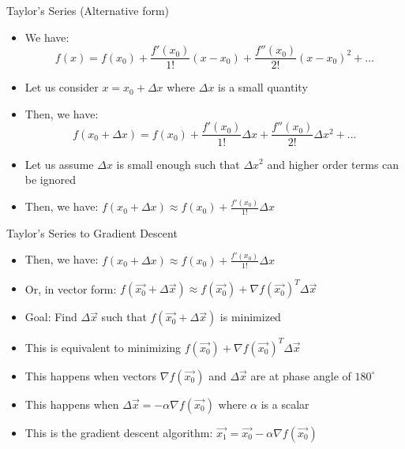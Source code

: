 \documentclass[usenames,dvipsnames]{beamer}
\begin{document}
  \begin{frame}{Taylor's Series (Alternative form)}
    \begin{itemize}[<+->]
    \item We have:
        \begin{equation}
            f(x) = f(x_0) + \frac{f'(x_0)}{1!}(x-x_0) + \frac{f''(x_0)}{2!}(x-x_0)^2 + \ldots
        \end{equation}
    \item Let us consider $x = x_0 + \Delta x$ where $\Delta x$ is a small quantity
    \item Then, we have:
    \begin{equation}
        f(x_0 + \Delta x) = f(x_0) + \frac{f'(x_0)}{1!}\Delta x + \frac{f''(x_0)}{2!}\Delta x^2 + \ldots
    \end{equation} 
    \item Let us assume $\Delta x$ is small enough such that $\Delta x^2$ and higher order terms can be ignored
    \item Then, we have:
    $f(x_0 + \Delta x) \approx f(x_0) + \frac{f'(x_0)}{1!}\Delta x$
    \end{itemize}


	

	
  \end{frame}

  \begin{frame}{Taylor's Series  to Gradient Descent}
    \begin{itemize}[<+->]
    \item Then, we have:
    $f(x_0 + \Delta x) \approx f(x_0) + \frac{f'(x_0)}{1!}\Delta x$
    \item Or, in vector form:
    $f(\vec{x_0} + \Delta \vec{x}) \approx f(\vec{x_0}) + \nabla f(\vec{x_0})^T\Delta \vec{x}$
    \item Goal: Find $\Delta \vec{x}$ such that $f(\vec{x_0} + \Delta \vec{x})$ is minimized
    \item This is equivalent to minimizing $f(\vec{x_0}) + \nabla f(\vec{x_0})^T\Delta \vec{x}$
    \item This happens when vectors $\nabla f(\vec{x_0})$ and $\Delta \vec{x}$ are at phase angle of $180^{\circ}$
    \item This happens when $\Delta \vec{x} = -\alpha \nabla f(\vec{x_0})$ where $\alpha$ is a scalar
    \item This is the gradient descent algorithm: $\vec{x_1} = \vec{x_0} - \alpha \nabla f(\vec{x_0})$
\end{itemize}
  \end{frame}
\end{document}
